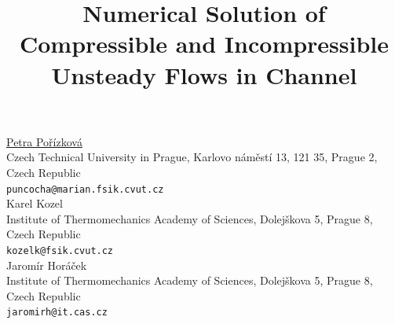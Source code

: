 \documentclass[article, A4, 11pt]{llncs}%
\begin{document}
\title{Numerical Solution of Compressible and Incompressible Unsteady Flows in Channel}
 \author{} \institute{}
\maketitle
\begin{center}
{\large \underline{Petra Po\v{r}\'izkov\'a}}\\
Czech Technical University in Prague, Karlovo n\'am\v{e}st\'i 13, 121 35, Prague 2, Czech Republic\\
{\tt puncocha@marian.fsik.cvut.cz}
\\ \vspace{4mm}
{\large Karel Kozel}\\
Institute of Thermomechanics Academy of Sciences, Dolej\v{s}kova 5, Prague 8, Czech Republic\\
{\tt kozelk@fsik.cvut.cz}
\\ \vspace{4mm}
{\large Jarom\'ir Hor\'a\v{c}ek}\\
Institute of Thermomechanics Academy of Sciences, Dolej\v{s}kova 5, Prague 8, Czech Republic\\
{\tt jaromirh@it.cas.cz}
\end{center}
\end{document}
